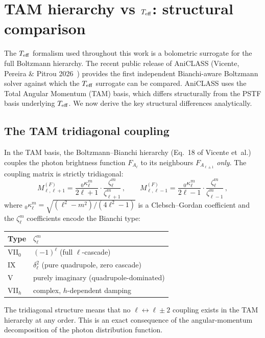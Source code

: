 \section{TAM hierarchy vs $T_{\mathrm{eff}}$: structural comparison}
\label{sec:TAM-vs-Teff}

The $T_{\mathrm{eff}}$ formalism used throughout this work is a
bolometric surrogate for the full Boltzmann hierarchy.
The recent public release of AniCLASS
(Vicente, Pereira \& Pitrou 2026~\cite{Vicente2026})
provides the first independent Bianchi-aware Boltzmann solver
against which the $T_{\mathrm{eff}}$ surrogate can be compared.
AniCLASS uses the Total Angular Momentum (TAM) basis, which
differs structurally from the PSTF basis underlying $T_{\mathrm{eff}}$.
We now derive the key structural differences analytically.

\subsection{The TAM tridiagonal coupling}

In the TAM basis, the Boltzmann--Bianchi hierarchy
(Eq.~18 of Vicente et~al.) couples the photon brightness
function $F_{A_\ell}$ to its neighbours $F_{A_{\ell \pm 1}}$
\emph{only}.  The coupling matrix is strictly tridiagonal:
\begin{equation}\label{eq:TAM-coupling}
M^{(F)}_{\ell,\ell+1}
= \frac{{}_{0}\kappa^m_\ell}{2\ell+1}
  \cdot \frac{\zeta^m_\ell}{\zeta^m_{\ell+1}}\,,
\qquad
M^{(F)}_{\ell,\ell-1}
= \frac{{}_{0}\kappa^m_\ell}{2\ell-1}
  \cdot \frac{\zeta^m_\ell}{\zeta^m_{\ell-1}}\,,
\end{equation}
where ${}_{0}\kappa^m_\ell = \sqrt{(\ell^2 - m^2)/(4\ell^2 - 1)}$
is a Clebsch--Gordan coefficient and the $\zeta^m_\ell$
coefficients encode the Bianchi type:
\begin{center}\small
\begin{tabular}{ll}
\hline\hline
Type & $\zeta^m_\ell$ \\
\hline
VII$_0$ & $(-1)^\ell$ (full $\ell$-cascade) \\
IX & $\delta^2_\ell$ (pure quadrupole, zero cascade) \\
V & purely imaginary (quadrupole-dominated) \\
VII$_h$ & complex, $h$-dependent damping \\
\hline\hline
\end{tabular}
\end{center}

\noindent
The tridiagonal structure means that no $\ell \leftrightarrow
\ell \pm 2$ coupling exists in the TAM hierarchy at any order.
This is an exact consequence of the angular-momentum
decomposition of the photon distribution function.

